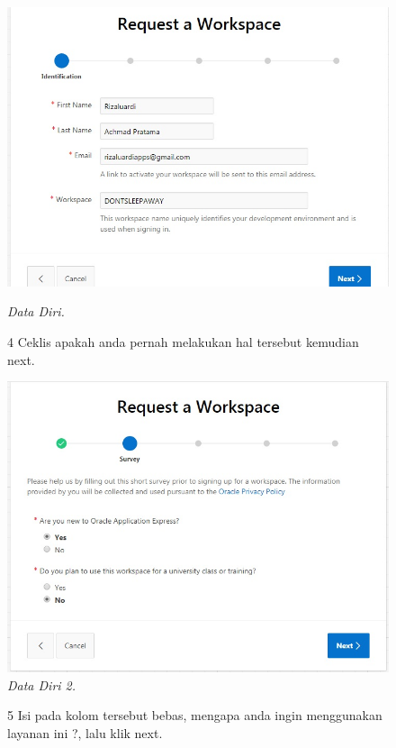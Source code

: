\begin{enumerate}
\begin{figure}[!htbp]
    \begin{center}
\includegraphics[scale=0.4]{figures/req1.jpg}
    \caption{\textit{Data Diri.}}
        \end{center}
        
\item[4]Ceklis apakah anda pernah melakukan hal tersebut kemudian next.  

    \begin{center}
\includegraphics[scale=0.4]{figures/req2.jpg}
    \caption{\textit{Data Diri 2.}}
        \end{center}
        \end{figure}

\begin{figure}
\item[5]Isi pada kolom tersebut bebas, mengapa anda ingin menggunakan layanan ini ?, lalu klik next.


\end{figure}
\end{enumerate}
